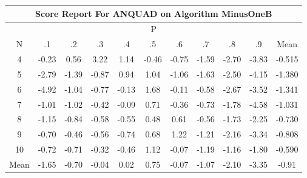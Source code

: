 \documentclass[11pt,a4paper]{report}
\begin{document}
\begin{longtable}{ | c || c | c | c | c | c | c | c | c | c || c |}
\hline
\multicolumn{11}{|c|}{ Score Report For ANQUAD on Algorithm MinusOneB} \\
\hline
\multicolumn{11}{|c|}{ P } \\
\hline
N & .1 & .2 & .3 & .4 & .5 & .6 & .7 & .8 & .9 & Mean\\
 \hline
 \hline
 \endhead
  4 &  \cellcolor[HTML]{FFF7F7} -0.23 &  \cellcolor[HTML]{EFEFFF} 0.56 &  \cellcolor[HTML]{AFAFFF} 3.22 &  \cellcolor[HTML]{DFDFFF} 1.14 &  \cellcolor[HTML]{FFF7F7} -0.46 &  \cellcolor[HTML]{FFEFEF} -0.75 &  \cellcolor[HTML]{FFD7D7} -1.59 &  \cellcolor[HTML]{FFB7B7} -2.70 &  \cellcolor[HTML]{FF9F9F} -3.83 & -0.515 \\
  5 &  \cellcolor[HTML]{FFB7B7} -2.79 &  \cellcolor[HTML]{FFDFDF} -1.39 &  \cellcolor[HTML]{FFE7E7} -0.87 &  \cellcolor[HTML]{E7E7FF} 0.94 &  \cellcolor[HTML]{E7E7FF} 1.04 &  \cellcolor[HTML]{FFE7E7} -1.06 &  \cellcolor[HTML]{FFD7D7} -1.63 &  \cellcolor[HTML]{FFBFBF} -2.50 &  \cellcolor[HTML]{FF9797} -4.15 & -1.380 \\
  6 &  \cellcolor[HTML]{FF8787} -4.92 &  \cellcolor[HTML]{FFE7E7} -1.04 &  \cellcolor[HTML]{FFEFEF} -0.77 &  \cellcolor[HTML]{FFFFFF} -0.13 &  \cellcolor[HTML]{D7D7FF} 1.68 &  \cellcolor[HTML]{FFFFFF} -0.11 &  \cellcolor[HTML]{FFEFEF} -0.58 &  \cellcolor[HTML]{FFBFBF} -2.67 &  \cellcolor[HTML]{FFA7A7} -3.52 & -1.341 \\
  7 &  \cellcolor[HTML]{FFE7E7} -1.01 &  \cellcolor[HTML]{FFE7E7} -1.02 &  \cellcolor[HTML]{FFF7F7} -0.42 &  \cellcolor[HTML]{FFFFFF} -0.09 &  \cellcolor[HTML]{EFEFFF} 0.71 &  \cellcolor[HTML]{FFF7F7} -0.36 &  \cellcolor[HTML]{FFEFEF} -0.73 &  \cellcolor[HTML]{FFCFCF} -1.78 &  \cellcolor[HTML]{FF8F8F} -4.58 & -1.031 \\
  8 &  \cellcolor[HTML]{FFDFDF} -1.15 &  \cellcolor[HTML]{FFE7E7} -0.84 &  \cellcolor[HTML]{FFEFEF} -0.58 &  \cellcolor[HTML]{FFEFEF} -0.55 &  \cellcolor[HTML]{EFEFFF} 0.48 &  \cellcolor[HTML]{EFEFFF} 0.61 &  \cellcolor[HTML]{FFEFEF} -0.56 &  \cellcolor[HTML]{FFD7D7} -1.73 &  \cellcolor[HTML]{FFC7C7} -2.25 & -0.730 \\
  9 &  \cellcolor[HTML]{FFEFEF} -0.70 &  \cellcolor[HTML]{FFF7F7} -0.46 &  \cellcolor[HTML]{FFEFEF} -0.56 &  \cellcolor[HTML]{FFEFEF} -0.74 &  \cellcolor[HTML]{EFEFFF} 0.68 &  \cellcolor[HTML]{DFDFFF} 1.22 &  \cellcolor[HTML]{FFDFDF} -1.21 &  \cellcolor[HTML]{FFC7C7} -2.16 &  \cellcolor[HTML]{FFA7A7} -3.34 & -0.808 \\
  10 &  \cellcolor[HTML]{FFEFEF} -0.72 &  \cellcolor[HTML]{FFEFEF} -0.71 &  \cellcolor[HTML]{FFF7F7} -0.32 &  \cellcolor[HTML]{FFF7F7} -0.46 &  \cellcolor[HTML]{DFDFFF} 1.12 &  \cellcolor[HTML]{FFFFFF} -0.07 &  \cellcolor[HTML]{FFDFDF} -1.19 &  \cellcolor[HTML]{FFDFDF} -1.16 &  \cellcolor[HTML]{FFCFCF} -1.80 & -0.590 \\
 \hline
 \hline
Mean &  \cellcolor[HTML]{FFD7D7} -1.65 &  \cellcolor[HTML]{FFEFEF} -0.70 &  \cellcolor[HTML]{FFFFFF} -0.04 &  \cellcolor[HTML]{FFFFFF} 0.02 &  \cellcolor[HTML]{EFEFFF} 0.75 &  \cellcolor[HTML]{FFFFFF} -0.07 &  \cellcolor[HTML]{FFE7E7} -1.07 &  \cellcolor[HTML]{FFC7C7} -2.10 &  \cellcolor[HTML]{FFA7A7} -3.35 &  \cellcolor[HTML]{FFE7E7} -0.91
\end{longtable}
\end{document}
